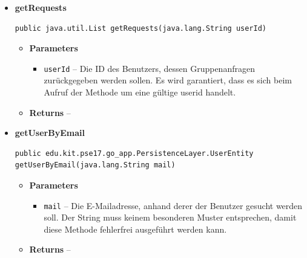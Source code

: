 \documentclass[11pt,a4paper]{report}
\begin{document}
{{{{{{{{{{{{{{{\begin{itemize}
{\begin{itemize}
{}%
\end{itemize}
}%
\item{ 
\hypertarget{edu.kit.pse17.go_app.PersistenceLayer.daos.UserDaoImp.getRequests(java.lang.String)}{{\bf  getRequests}\\}
\begin{lstlisting}[frame=none]
public java.util.List getRequests(java.lang.String userId)\end{lstlisting} %
\begin{itemize}
\item{
{\bf  Parameters}
  \begin{itemize}
   \item{
\texttt{userId} -- Die ID des Benutzers, dessen Gruppenanfragen zurückgegeben werden sollen. Es wird garantiert, dass es sich beim Aufruf der Methode um eine gültige userid handelt.}
  \end{itemize}
}%
\item{{\bf  Returns} -- 
 
}%
\end{itemize}
}%
\item{ 
\hypertarget{edu.kit.pse17.go_app.PersistenceLayer.daos.UserDaoImp.getUserByEmail(java.lang.String)}{{\bf  getUserByEmail}\\}
\begin{lstlisting}[frame=none]
public edu.kit.pse17.go_app.PersistenceLayer.UserEntity getUserByEmail(java.lang.String mail)\end{lstlisting} %
\begin{itemize}
\item{
{\bf  Parameters}
  \begin{itemize}
   \item{
\texttt{mail} -- Die E-Mailadresse, anhand derer der Benutzer gesucht werden soll. Der String muss keinem besonderen Muster entsprechen, damit diese Methode fehlerfrei ausgeführt werden kann.}
  \end{itemize}
}%
\item{{\bf  Returns} -- 
 
}
\end{itemize}}
\end{itemize}}}}}}}}}}}}}}}}
\end{document}
